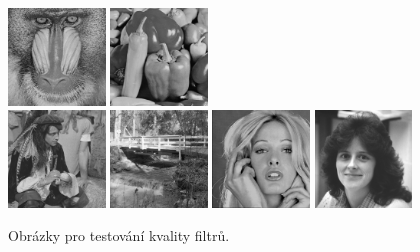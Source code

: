 \begin{figure}[hbt]
    \includegraphics[width=0.23\textwidth]{fig/testimages/mandril_gray.png}\hfill
    \includegraphics[width=0.23\textwidth]{fig/testimages/peppers_gray.png}\hfill
    \\\textwidth
    \includegraphics[width=0.23\textwidth]{fig/testimages/pirate.png}\hfill
    \includegraphics[width=0.23\textwidth]{fig/testimages/walkbridge.png}\hfill
    \includegraphics[width=0.23\textwidth]{fig/testimages/woman_blonde.png}\hfill
    \includegraphics[width=0.23\textwidth]{fig/testimages/woman_darkhair.png}\hfill
    \caption{Obrázky pro testování kvality filtrů.}
    \label{obrTestovaci}
\end{figure}

